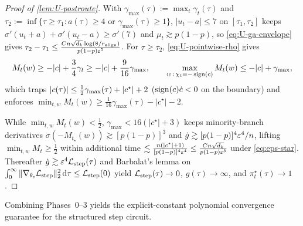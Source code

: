\begin{proof}[Proof of \cref{lem:U-postroute}]
With $\gamma_{\max}(\tau) := \max_t\gamma_t(\tau)$ and $\tau_2 := \inf\{\tau \ge \tau_1 : a(\tau) \ge 4 \text{ or } \gamma_{\max}(\tau) \ge 1\}$, $|u_t - a| \le 7$ on $[\tau_1, \tau_2]$ keeps $\sigma'(u_t+a)+\sigma'(u_t-a) \ge \sigma'(7)$ and $\mu_t \gtrsim p(1-p)$, so \cref{eq:U-ga-envelope} gives $\tau_2 - \tau_1 \le \frac{C n\sqrt{d_k}\log(8/r_{\mathrm{align}})}{p(1-p)\varepsilon^5}$. For $\tau \ge \tau_2$, \cref{eq:U-pointwise-rho} gives
\begin{equation}
 M_t(w) \ge -|c| + \frac{3}{4}\gamma_t \ge -|c| + \frac{9}{16}\gamma_{\max}, \qquad
 \max_{w\,:\,\chi_t = -\operatorname{sign}(c)} M_t(w) \le -|c| + \gamma_{\max},
 \label{eq:U-margin-sandwich}
\end{equation}
which traps $|c(\tau)| \le \frac{1}{2}\gamma_{\max}(\tau) + |c^\star| + 2$ ($\operatorname{sign}(c)\dot{c} < 0$ on the boundary) and enforces $\min_{t,w} M_t(w) \ge \frac{1}{16}\gamma_{\max}(\tau) - |c^\star| - 2$.

While $\min_{t,w} M_t(w) < \frac{1}{2}$, $\gamma_{\max} < 16(|c^\star|+3)$ keeps minority-branch derivatives $\sigma(-M_{t_\star}(w)) \gtrsim [p(1-p)]^3$ and $\dot g \gtrsim [p(1-p)]^4\varepsilon^4/n$, lifting $\min_{t,w} M_t \ge \frac{1}{2}$ within additional time $\lesssim \frac{n(|c^\star|+1)}{[p(1-p)]^4\varepsilon^4} \le \frac{Cn\sqrt{d_k}}{p(1-p)\varepsilon^5}$ under \cref{eq:eps-star}. Thereafter $\dot g \gtrsim \varepsilon^4\mathcal L_{\mathrm{step}}(\tau)$ and Barbalat's lemma on $\int_0^\infty \|\nabla_{\theta_{\mathrm s}}\mathcal L_{\mathrm{step}}\|_2^2\,\mathrm{d}\tau \le \mathcal L_{\mathrm{step}}(0)$ yield $\mathcal L_{\mathrm{step}}(\tau) \to 0$, $g(\tau) \to \infty$, and $\pi_t^\star(\tau) \to 1$.
\end{proof}

Combining Phases~0--3 yields the explicit-constant polynomial convergence guarantee for the structured step circuit.

